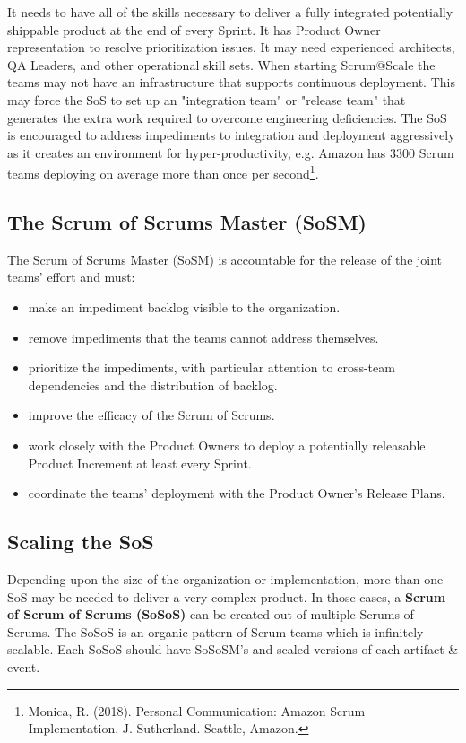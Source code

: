 \documentclass[12pt,a4paper,parskip=full]{scrartcl}
\begin{document}
It needs to have all of the skills necessary to deliver a fully integrated
potentially shippable product at the end of every Sprint. It has Product
Owner representation to resolve prioritization issues. It may need
experienced architects, QA Leaders, and other operational skill sets.  When
starting Scrum@Scale the teams may not have an infrastructure that supports
continuous deployment. This may force the SoS to set up an "integration
team" or "release team" that generates the extra work required to overcome
engineering deficiencies.  The SoS is encouraged to address impediments to
integration and deployment aggressively as it creates an environment for
hyper-productivity, e.g. Amazon has 3300 Scrum teams deploying on average
more than once per second\footnote{Monica, R. (2018). Personal
Communication: Amazon Scrum Implementation. J. Sutherland. Seattle,
Amazon.}.

\subsection{The Scrum of Scrums Master (SoSM)}
The Scrum of Scrums Master (SoSM) is accountable for the release of the
joint teams' effort and must:
\begin{itemize}
\item make an impediment backlog visible to the organization.
\item remove impediments that the teams cannot address themselves.
\item prioritize the impediments, with particular attention to cross-team
dependencies and the distribution of backlog.
\item improve the efficacy of the Scrum of Scrums.
\item work closely with the Product Owners to deploy a potentially
releasable Product Increment at least every Sprint.
\item coordinate the teams' deployment with the Product Owner's Release
Plans.
\end{itemize}

\subsection{Scaling the SoS}
Depending upon the size of the organization or implementation, more than
one SoS may be needed to deliver a very complex product. In those cases, a
\textbf{Scrum of Scrum of Scrums (SoSoS)} can be created out of multiple
Scrums of Scrums. The SoSoS is an organic pattern of Scrum teams which is
infinitely scalable. Each SoSoS should have SoSoSM's and scaled versions of
each artifact \& event.
\end{document}
